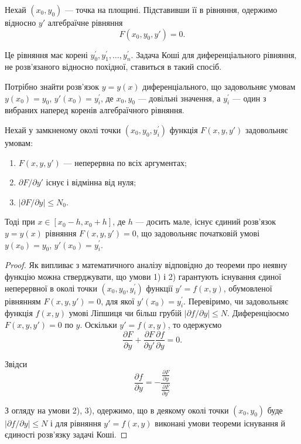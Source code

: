 Нехай $(x_0, y_0)$ --- точка на площині. Підставивши її в рівняння, одержимо відносно $y'$ алгебраїчне рівняння
\begin{equation*}
	F(x_0, y_0, y') = 0.
\end{equation*}

Це рівняння має корені $y_0^\prime, y_1^\prime, \ldots, y_n^\prime$. Задача Коші для диференціального рівняння, не розв'язаного відносно похідної, ставиться в такий спосіб. \parvskip

Потрібно знайти розв'язок $y=y(x)$ диференціального, що задовольняє умовам $y(x_0)=y_0$, $y'(x_0)=y_i^\prime$, де $x_0,y_0$ --- довільні значення, а $y_i^\prime$ --- один з вибраних наперед коренів алгебраїчного рівняння.

\begin{theorem}
	Нехай у замкненому околі точки $(x_0, y_0, y_i^\prime)$ функція $F(x,y,y')$ задовольняє умовам:
	\begin{enumerate}
		\item $F(x,y,y')$ --- неперервна по всіх аргументах;
		\item $\partial F / \partial y'$ існує і відмінна від нуля;
		\item $\left| \partial F / \partial y \right| \le N_0$.
	\end{enumerate}

	Тоді при $x \in [x_0 - h, x_0 + h]$, де $h$ --- досить мале, існує єдиний розв'язок $y=y(x)$ рівняння $F(x, y, y') =0$, що задовольняє початковій умові $y(x_0)=y_0$, $y'(x_0)=y_i^\prime$.
\end{theorem}

\begin{proof}
	Як випливає з математичного аналізу відповідно до теореми про неявну функцію можна стверджувати, що умови 1) і 2) гарантують існування єдиної неперервної в околі точки $(x_0,y_0,y_i^\prime)$ функції $y'=f(x,y)$, обумовленої рівнянням $F(x,y,y')=0$, для якої $y'(x_0)=y_i^\prime$. Перевіримо, чи задовольняє функція $f(x,y)$ умові Ліпшиця чи більш грубій $\left|\partial f / \partial y\right| \le N$. Диференціюємо $F(x,y,y')=0$ по $y$. Оскільки $y'=f(x,y)$, то одержуємо
	\begin{equation*}
		\frac{\partial F}{\partial y} + \frac{\partial F}{\partial y'} \frac{\partial f}{\partial y} = 0.
	\end{equation*}

	Звідси
	\begin{equation*}
		\frac{\partial f}{\partial y} = - \frac{\frac{\partial F}{\partial y}}{\frac{\partial F}{\partial y'}} 
	\end{equation*} 

	З огляду на умови 2), 3), одержимо, що в деякому околі точки $(x_0,y_0)$ буде $\left|\partial f / \partial y\right| \le N$ і для рівняння $y'=f(x,y)$ виконані умови теореми існування й єдиності розв'язку задачі Коші.
\end{proof}
